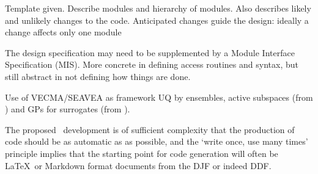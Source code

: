 
Template given. Describe modules and hierarchy of modules. Also describes likely and unlikely changes to the code.
Anticipated changes guide the design: ideally a change affects only one module


The design specification may need to be supplemented by a Module Interface Specification (MIS).
More concrete in defining access routines and syntax, but still abstract in not defining how
things are done.

Use of VECMA/SEAVEA as framework
UQ by ensembles,  active subspaces (from \cite{y3re242}) and GPs for surrogates (from \cite{y3re252}).

The proposed \nep\ development is of sufficient complexity that the production
of code should be as automatic as as possible, and the `write once, use many times'
principle implies that the starting point for code generation will often be \LaTeX \ or Markdown format
documents from the DJF or indeed DDF.

